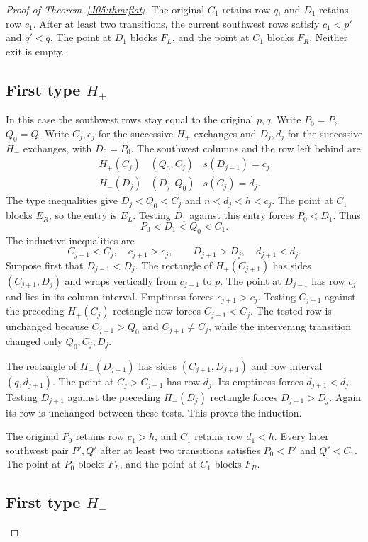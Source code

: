 \documentclass[11pt,oneside]{report}
\theoremstyle{definition}
\numberwithin{equation}{section}
\newcommand{\Hp}{H_+}\newcommand{\Hm}{H_-}
\begin{document}
\begin{proof}[Proof of Theorem~\ref{J05:thm:flat}]
The original $C_1$ retains row $q$, and $D_1$ retains row $c_1$.
After at least two transitions, the current southwest rows satisfy
$c_1<p'$ and $q'<q$. The point at $D_1$ blocks $F_L$, and the point at $C_1$
blocks $F_R$. Neither exit is empty.

\subsection*{First type $\Hp$}

In this case the southwest rows stay equal to the original $p,q$.
Write $P_0=P$, $Q_0=Q$. Write $C_j,c_j$ for the successive $\Hp$ exchanges
and $D_j,d_j$ for the successive $\Hm$ exchanges, with $D_0=P_0$.
The southwest columns and the row left behind are
\[
 \begin{array}{c|c|c}
 \Hp(C_j)&(Q_0,C_j)&s(D_{j-1})=c_j\\
 \Hm(D_j)&(D_j,Q_0)&s(C_j)=d_j.
 \end{array}
\]
The type inequalities give $D_j<Q_0<C_j$ and $n<d_j<h<c_j$.
The point at $C_1$ blocks $E_R$, so the entry is $E_L$.
Testing $D_1$ against this entry forces $P_0<D_1$. Thus
\[
 P_0<D_1<Q_0<C_1.
\]
The inductive inequalities are
\[
 C_{j+1}<C_j,\quad c_{j+1}>c_j,\qquad
 D_{j+1}>D_j,\quad d_{j+1}<d_j.
\]
Suppose first that $D_{j-1}<D_j$.
The rectangle of $\Hp(C_{j+1})$ has sides $(C_{j+1},D_j)$ and wraps
vertically from $c_{j+1}$ to $p$. The point at $D_{j-1}$ has row $c_j$ and
lies in its column interval. Emptiness forces $c_{j+1}>c_j$.
Testing $C_{j+1}$ against the preceding $\Hp(C_j)$ rectangle now forces
$C_{j+1}<C_j$. The tested row is unchanged because $C_{j+1}>Q_0$ and
$C_{j+1}\ne C_j$, while the intervening transition changed only
$Q_0,C_j,D_j$.

The rectangle of $\Hm(D_{j+1})$ has sides $(C_{j+1},D_{j+1})$ and row
interval $(q,d_{j+1})$. The point at $C_j>C_{j+1}$ has row $d_j$.
Its emptiness forces $d_{j+1}<d_j$. Testing $D_{j+1}$ against the preceding
$\Hm(D_j)$ rectangle forces $D_{j+1}>D_j$. Again its row is unchanged
between these tests. This proves the induction.

The original $P_0$ retains row $c_1>h$, and $C_1$ retains row $d_1<h$.
Every later southwest pair $P',Q'$ after at least two transitions satisfies
$P_0<P'$ and $Q'<C_1$. The point at $P_0$ blocks $F_L$, and the point at
$C_1$ blocks $F_R$.

\subsection*{First type $\Hm$}


\end{proof}
\end{document}
